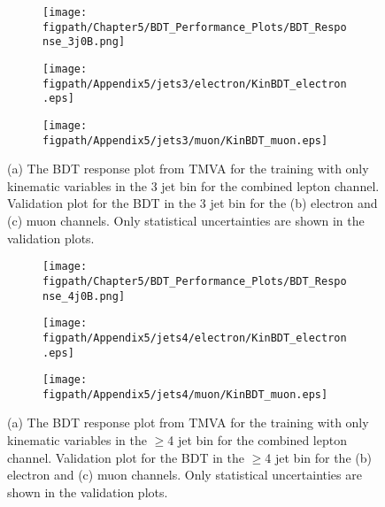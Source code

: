 \begin{figure}[!hbt]
    \centering
    \begin{subfigure}[t]{0.317\textwidth}
        \texttt{[image: \\figpath/Chapter5/BDT\_Performance\_Plots/BDT\_Response\_3j0B.png]}
        \caption{}
        \label{fig:BDT_Response_3j0B_TMVA}
    \end{subfigure}
    \begin{subfigure}[t]{0.317\textwidth}
        \texttt{[image: \\figpath/Appendix5/jets3/electron/KinBDT\_electron.eps]}
        \caption{}
        \label{fig:KinBDT_jets3_electron_noSys}
    \end{subfigure}
    \begin{subfigure}[t]{0.317\textwidth}
        \texttt{[image: \\figpath/Appendix5/jets3/muon/KinBDT\_muon.eps]}
        \caption{}
        \label{fig:KinBDT_jets3_muon_noSys}
    \end{subfigure}
    \caption{(a) The BDT response plot from TMVA for the training with only kinematic variables in the 3 jet bin for the combined lepton channel. Validation plot for the BDT in the 3 jet bin for the (b) electron and (c) muon channels. Only statistical uncertainties are shown in the validation plots.}
    \label{fig:KinBDT_Comparison_jets3}
\end{figure}

\begin{figure}[!hbt]
    \centering
    \begin{subfigure}[t]{0.317\textwidth}
        \texttt{[image: \\figpath/Chapter5/BDT\_Performance\_Plots/BDT\_Response\_4j0B.png]}
        \caption{}
        \label{fig:BDT_Response_4j0B_TMVA}
    \end{subfigure}
    \begin{subfigure}[t]{0.317\textwidth}
        \texttt{[image: \\figpath/Appendix5/jets4/electron/KinBDT\_electron.eps]}
        \caption{}
        \label{fig:KinBDT_jets4_electron_noSys}
    \end{subfigure}
    \begin{subfigure}[t]{0.317\textwidth}
        \texttt{[image: \\figpath/Appendix5/jets4/muon/KinBDT\_muon.eps]}
        \caption{}
        \label{fig:KinBDT_jets4_muon_noSys}
    \end{subfigure}
    \caption{(a) The BDT response plot from TMVA for the training with only kinematic variables in the $\geqslant$4 jet bin for the combined lepton channel. Validation plot for the BDT in the $\geqslant$4 jet bin for the (b) electron and (c) muon channels. Only statistical uncertainties are shown in the validation plots.}
    \label{fig:KinBDT_Comparison_jets4}
\end{figure}

